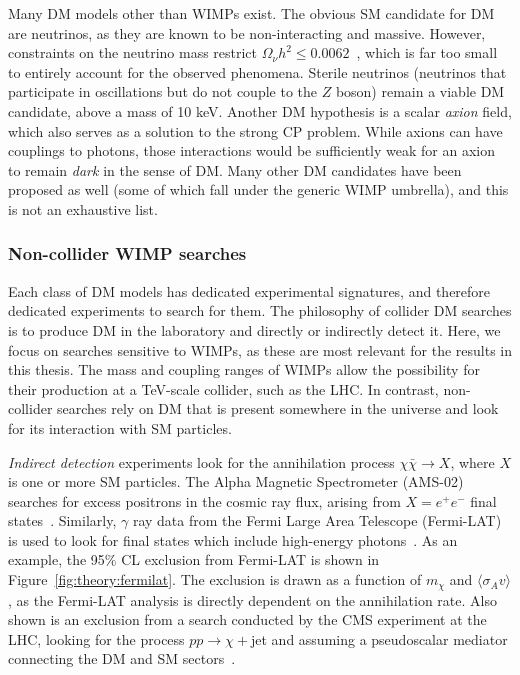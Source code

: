 Many DM models other than WIMPs exist.
The obvious SM candidate for DM are neutrinos, as they are known to be non-interacting and massive.
However, constraints on the neutrino mass restrict $\Omega_\nu h^2 \leq 0.0062$~\cite{pdg}, which is far too small to entirely account for the observed phenomena. 
Sterile neutrinos (neutrinos that participate in oscillations but do not couple to the $Z$ boson) remain a viable DM candidate, above a mass of 10 keV.
Another DM hypothesis is a scalar \emph{axion} field, which also serves as a solution to the strong CP problem.
While axions can have couplings to photons, those interactions would be sufficiently weak for an axion to remain \emph{dark} in the sense of DM.
Many other DM candidates have been proposed as well (some of which fall under the generic WIMP umbrella), and this is not an exhaustive list.

\subsubsection{Non-collider WIMP searches}

Each class of DM models has dedicated experimental signatures, and therefore dedicated experiments to search for them.
The philosophy of collider DM searches is to produce DM in the laboratory and directly or indirectly detect it.
Here, we focus on searches sensitive to WIMPs, as these are most relevant for the results in this thesis.
The mass and coupling ranges of WIMPs allow the possibility for their production at a TeV-scale collider, such as the LHC.
In contrast, non-collider searches rely on DM that is present somewhere in the universe and look for its interaction with SM particles.

\emph{Indirect detection} experiments look for the annihilation process $\chi\bar\chi\rightarrow X$, where $X$ is one or more SM particles.
The Alpha Magnetic Spectrometer (AMS-02) searches for excess positrons in the cosmic ray flux, arising from $X=e^+e^-$ final states~\cite{ams}. 
Similarly, $\gamma$ ray data from the Fermi Large Area Telescope (Fermi-LAT) is used to look for final states which include high-energy photons~\cite{fermilat}.
As an example, the 95\% CL exclusion from Fermi-LAT is shown in Figure~\ref{fig:theory:fermilat}.
The exclusion is drawn as a function of $m_\chi$ and $\langle \sigma_A v\rangle$, as the Fermi-LAT analysis is directly dependent on the annihilation rate.
Also shown is an exclusion from a search conducted by the CMS experiment at the LHC, looking for the process $pp\rightarrow \chi+$jet and assuming a pseudoscalar mediator connecting the DM and SM sectors~\cite{monojet}.

